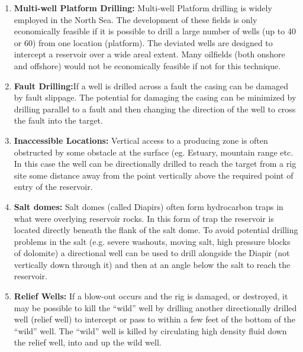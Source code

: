 \begin{enumerate}

\item \textbf{Multi-well Platform Drilling:} Multi-well Platform drilling is
widely employed in the North Sea. The development of these
fields is only economically feasible if it is possible to drill a
large number of wells (up to 40 or 60) from one location
(platform). The deviated wells are designed to intercept a
reservoir over a wide areal extent. Many oilfields (both onshore
and offshore) would not be economically feasible if not for this
technique.

\item \textbf{Fault Drilling:}If a well is drilled across a fault the casing can
be damaged by fault slippage. The potential for damaging the
casing can be minimized by drilling parallel to a fault and then
changing the direction of the well to cross the fault into the
target.



\item \textbf{Inaccessible Locations:} Vertical access to a producing zone is
often obstructed by some obstacle at the surface (eg. Estuary,
mountain range etc. In this case the well can be directionally
drilled to reach the target from a rig site some distance away
from the point vertically above the required point of entry of the
reservoir.



\item \textbf{Salt domes:} Salt domes (called Diapirs) often
form hydrocarbon traps in what were overlying
reservoir rocks. In this form of trap the reservoir
is located directly beneath the flank of the salt
dome. To avoid potential drilling problems in
the salt (e.g. severe washouts, moving salt, high
pressure blocks of dolomite) a directional well
can be used to drill alongside the Diapir (not
vertically down through it) and then at an angle
below the salt to reach the reservoir.




\item \textbf{Relief Wells:} If a blow-out occurs and the rig is
damaged, or destroyed, it may be possible to kill
the “wild” well by drilling another directionally
drilled well (relief well) to intercept or pass to
within a few feet of the bottom of the “wild”
well. The “wild” well is killed by circulating
high density fluid down the relief well, into and
up the wild well.

\end{enumerate}



